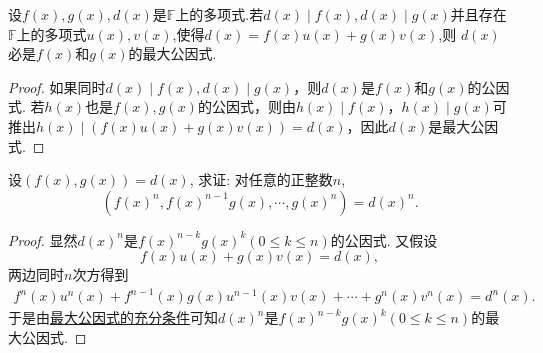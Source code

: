 \documentclass[../../main.tex]{subfiles}%
\begin{document}
\begin{theorem}[最大公因式的充分条件]\label{theorem:最大公因式的充分条件}
设\(f(x),g(x),d(x)\)是\(\mathbb{F}\)上的多项式.若\(d(x)\mid f(x),d(x)\mid g(x)\)并且存在\(\mathbb{F}\)上的多项式$u(x),v(x)$,使得\(d(x)=f(x)u(x)+g(x)v(x)\),则 \(d(x)\)必是\(f(x)\)和\(g(x)\)的最大公因式.
\end{theorem}
\begin{proof}

如果同时\(d(x)\mid f(x),d(x)\mid g(x)\)，则\(d(x)\)是\(f(x)\)和\(g(x)\)的公因式. 若\(h(x)\)也是\(f(x),g(x)\)的公因式，则由\(h(x)\mid f(x)\)，\(h(x)\mid g(x)\)可推出\(h(x)\mid (f(x)u(x)+g(x)v(x)) = d(x)\)，因此\(d(x)\)是最大公因式.

\end{proof}

\begin{example}
设\((f(x),g(x)) = d(x)\), 求证: 对任意的正整数\(n\),
\[
(f(x)^n,f(x)^{n - 1}g(x),\cdots,g(x)^n)=d(x)^n.
\] 
\end{example}
\begin{proof}

显然\(d(x)^n\)是\(f(x)^{n - k}g(x)^k(0\leqslant  k\leqslant  n)\)的公因式. 又假设
\[
f(x)u(x)+g(x)v(x)=d(x),
\]
两边同时\(n\)次方得到
\begin{align*}
f^n\left( x \right) u^n\left( x \right) +f^{n-1}\left( x \right) g\left( x \right) u^{n-1}\left( x \right) v\left( x \right) +\cdots +g^n\left( x \right) v^n\left( x \right) =d^n\left( x \right) .    
\end{align*}
于是由\hyperref[theorem:最大公因式的充分条件]{最大公因式的充分条件}可知\(d(x)^n\)是\(f(x)^{n - k}g(x)^k(0\leqslant  k\leqslant  n)\)的最大公因式.

\end{proof}
\end{document}
